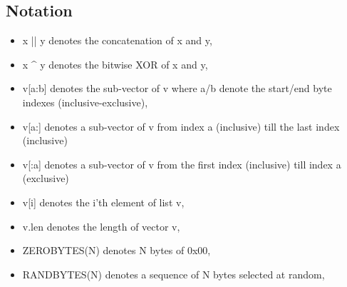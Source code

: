 \subsection{Notation}\label{sec:notation}
\begin{itemize}
    \item x || y denotes the concatenation of x and y,
    \item x \^{} y denotes the bitwise XOR of x and y,
    \item v[a:b] denotes the sub-vector of v where a/b denote the start/end byte indexes (inclusive-exclusive),
    \item v[a:] denotes a sub-vector of v from index a (inclusive) till the last index (inclusive)
    \item v[:a] denotes a sub-vector of v from the first index (inclusive) till index a (exclusive)
    \item v[i] denotes the i'th element of list v,
    \item v.len denotes the length of vector v,
    \item ZEROBYTES(N) denotes N bytes of 0x00,
    \item RANDBYTES(N) denotes a sequence of N bytes selected at random,
\end{itemize}

